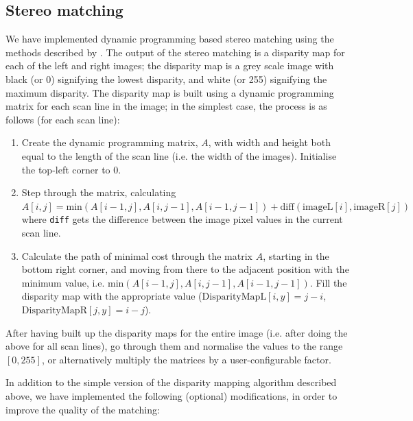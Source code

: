 
\subsection{Stereo matching}
\label{sec:stereo}
We have implemented dynamic programming based stereo matching using the methods
described by \citet{realtimestereo}. The output of the stereo matching is a
disparity map for each of the left and right images; the disparity map is a grey
scale image with black (or 0) signifying the lowest disparity, and white (or
255) signifying the maximum disparity. The disparity map is built using a
dynamic programming matrix for each scan line in the image; in the simplest
case, the process is as follows (for each scan line):

\begin{enumerate}
\item Create the dynamic programming matrix, $A$, with width and height both
  equal to the length of the scan line (i.e. the width of the images).
  Initialise the top-left corner to 0.

\item Step through the matrix, calculating $A[i,j] = \mathrm{min}(A[i-1,j],
  A[i,j-1], A[i-1,j-1]) + \mathrm{diff}(\mathrm{imageL}[i], \mathrm{imageR}[j])$
  where \texttt{diff} gets the difference between the image pixel values in the
  current scan line.

\item Calculate the path of minimal cost through the matrix $A$, starting in the
  bottom right corner, and moving from there to the adjacent position with the
  minimum value, i.e. $\mathrm{min}(A[i-1,j], A[i,j-1], A[i-1,j-1])$. Fill the
  disparity map with the appropriate value ($\mathrm{DisparityMapL}[i,y]=j-i$,
  $\mathrm{DisparityMapR}[j,y]=i-j$).
\end{enumerate}

After having built up the disparity maps for the entire image (i.e. after doing
the above for all scan lines), go through them and normalise the values to the
range $[0,255]$, or alternatively multiply the matrices by a user-configurable
factor.

In addition to the simple version of the disparity mapping algorithm described
above, we have implemented the following (optional) modifications, in order to
improve the quality of the matching:

